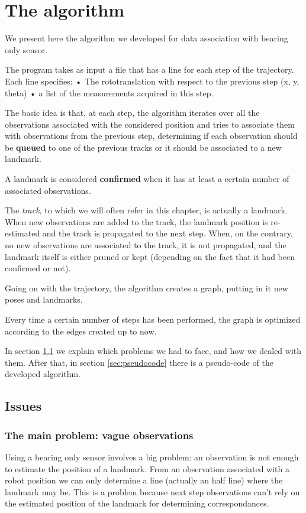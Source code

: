 \chapter{The algorithm}\label{cap:Algorithm}
We present here the algorithm we developed for data association with bearing only sensor.

The program takes as input a file that has a line for each step of the trajectory.
Each line specifies:
• The rototranslation with respect to the previous step (x, y, theta)
• a list of the measurements acquired in this step.

The basic idea is that, at each step, the algorithm iterates over all the observations associated with the considered position and tries to associate them with observations from the previous step, determining if each observation should be \textbf{queued} to one of the previous tracks or it should be associated to a new landmark.

A landmark is considered \textbf{confirmed} when it has at least a certain number of associated observations.

The \textit{track}, to which we will often refer in this chapter, is actually a landmark. When new observations are added to the track, the landmark position is re-estimated and the track is propagated to the next step.
When, on the contrary, no new observations are associated to the track, it is not propagated, and the landmark itself is either pruned or kept (depending on the fact that it had been confirmed or not).

Going on with the trajectory, the algorithm creates a graph, putting in it new poses and landmarks.

Every time a certain number of steps has been performed, the graph is optimized according to the edges created up to now.

In section \ref{sec:issues} we explain which problems we had to face, and how we dealed with them.
After that, in section \ref{sec:pseudocode} there is a pseudo-code of the developed algorithm.

\section{Issues}\label{sec:issues}
\subsection{The main problem: vague observations}
Using a bearing only sensor involves a big problem: an observation is not enough to estimate the position of a landmark.
From an observation associated with a robot position we can only determine a line (actually an half line) where the landmark may be.
This is a problem because next step observations can't rely on the estimated position of the landmark for determining correspondances.

